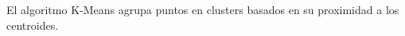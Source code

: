 \documentclass[preview]{standalone}
\begin{document}
\begin{center}
El algoritmo K-Means agrupa puntos en clusters basados en su proximidad a los centroides.
\end{center}
\end{document}
